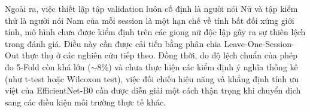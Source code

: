 Ngoài ra, việc thiết lập tập validation luôn cố định là người nói Nữ và tập kiểm thử là người nói Nam của mỗi session là một hạn chế về tính bất đối xứng giới tính, mô hình chưa được kiểm định trên các giọng nữ độc lập gây ra sự thiên lệch trong đánh giá. Điều này cần được cải tiến bằng phân chia Leave-One-Session-Out thực thụ ở các nghiên cứu tiếp theo. Đồng thời, do độ lệch chuẩn của phép đo 5-Fold còn khá lớn ($\sim 8\%$) và chưa thực hiện các kiểm định ý nghĩa thống kê (như t-test hoặc Wilcoxon test), việc đối chiếu hiệu năng và khẳng định tính ưu việt của EfficientNet-B0 cần được diễn giải một cách thận trọng khi chuyển dịch sang các điều kiện môi trường thực tế khác.
